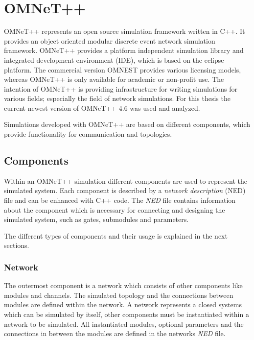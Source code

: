\chapter{OMNeT++}
\label{cha:omnet}

OMNeT++ represents an open source simulation framework written in C++.
It provides an object oriented modular discrete event network simulation framework.
OMNeT++ provides a platform independent simulation library and integrated development environment (IDE), which is based on the eclipse platform.
The commercial version OMNEST provides various licensing models, whereas OMNeT++ is only available for academic or non-profit use.
The intention of OMNeT++ is providing infrastructure for writing simulations for various fields; especially the field of network simulations.
For this thesis the current newest version of OMNeT++ 4.6 was used and analyzed.

Simulations developed with OMNeT++ are based on different components, which provide functionality for communication and topologies.

\section{Components}
\label{sec:omnet_components}
Within an OMNeT++ simulation different components are used to represent the simulated system.
Each component is described by a \emph{network description} (NED) file and can be enhanced with C++ code.
The \emph{NED} file contains information about the component which is necessary for connecting and designing the simulated system, such as gates, submodules and parameters.

The different types of components and their usage is explained in the next sections.

\subsection{Network}
\label{sec:omnet_components_network}
The outermost component is a network which consists of other components like modules and channels.
The simulated topology and the connections between modules are defined within the network.
A network represents a closed systems which can be simulated by itself, other components must be instantiated within a network to be simulated.
All instantiated modules, optional parameters and the connections in between the modules are defined in the networks \emph{NED} file. \cite[section 3.2.1]{omnet_manual}

